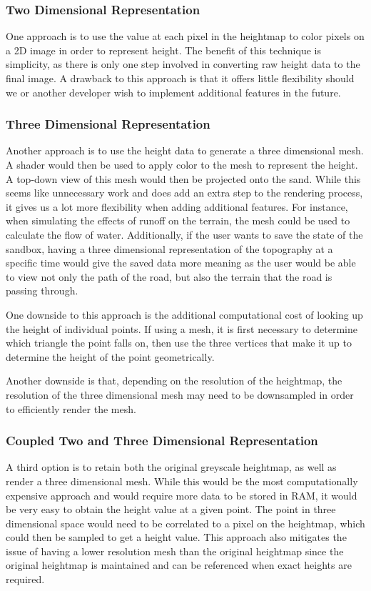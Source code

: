 \subsubsection{Two Dimensional Representation}
One approach is to use the value at each pixel in the heightmap to color pixels on a 2D image in order to represent height. 
The benefit of this technique is simplicity, as there is only one step involved in converting raw height data to the final image. 
A drawback to this approach is that it offers little flexibility should we or another developer wish to implement additional features in the future.

\subsubsection{Three Dimensional Representation}
Another approach is to use the height data to generate a three dimensional mesh. A shader would then be used to apply color to the mesh to represent the height. A top-down view of this mesh would then be projected onto the sand. While this seems like unnecessary work and does add an extra step to the rendering process, it gives us a lot more flexibility when adding additional features. For instance, when simulating the effects of runoff on the terrain, the mesh could be used to calculate the flow of water. Additionally, if the user wants to save the state of the sandbox, having a three dimensional representation of the topography at a specific time would give the saved data more meaning as the user would be able to view not only the path of the road, but also the terrain that the road is passing through. 

One downside to this approach is the additional computational cost of looking up the height of individual points. If using a mesh, it is first necessary to determine which triangle the point falls on, then use the three vertices that make it up to determine the height of the point geometrically.

Another downside is that, depending on the resolution of the heightmap, the resolution of the three dimensional mesh may need to be downsampled in order to efficiently render the mesh.

\subsubsection{Coupled Two and Three Dimensional Representation}
A third option is to retain both the original greyscale heightmap, as well as render a three dimensional mesh. While this would be the most computationally expensive approach and would require more data to be stored in RAM, it would be very easy to obtain the height value at a given point. The point in three dimensional space would need to be correlated to a pixel on the heightmap, which could then be sampled to get a height value. This approach also mitigates the issue of having a lower resolution mesh than the original heightmap since the original heightmap is maintained and can be referenced when exact heights are required.

